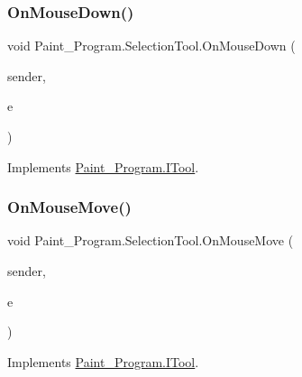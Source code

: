 \subsubsection{\texorpdfstring{On\+Mouse\+Down()}{OnMouseDown()}}
{\footnotesize\ttfamily void Paint\+\_\+\+Program.\+Selection\+Tool.\+On\+Mouse\+Down (\begin{DoxyParamCaption}\item[{object}]{sender,  }\item[{Mouse\+Event\+Args}]{e }\end{DoxyParamCaption})\hspace{0.3cm}{\ttfamily [inline]}}



Implements \mbox{\hyperlink{interface_paint___program_1_1_i_tool_a73d8797f4f2b1e0d8efe8aadcd44e840}{Paint\+\_\+\+Program.\+I\+Tool}}.

\mbox{\label{class_paint___program_1_1_selection_tool_adec8eaad22f0c7ac1a744247c87e16bc}} 
\subsubsection{\texorpdfstring{On\+Mouse\+Move()}{OnMouseMove()}}
{\footnotesize\ttfamily void Paint\+\_\+\+Program.\+Selection\+Tool.\+On\+Mouse\+Move (\begin{DoxyParamCaption}\item[{object}]{sender,  }\item[{Mouse\+Event\+Args}]{e }\end{DoxyParamCaption})\hspace{0.3cm}{\ttfamily [inline]}}



Implements \mbox{\hyperlink{interface_paint___program_1_1_i_tool_a6a1cbe840b5cfc8a9b9463cc21590845}{Paint\+\_\+\+Program.\+I\+Tool}}.

\mbox{\label{class_paint___program_1_1_selection_tool_aa271d61b0d9c182e9bba5fab0b2893eb}} 
